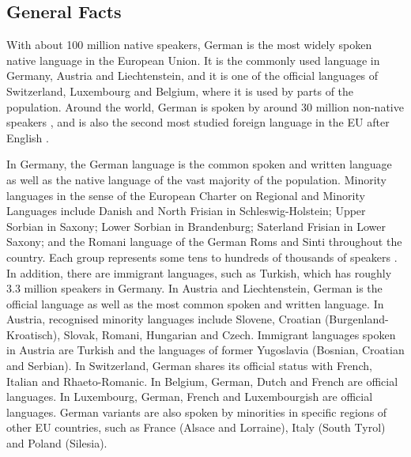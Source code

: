 \clearpage


\begin{multicols}{2}

\subsection{General Facts}

With about 100 million native speakers, German is the most widely spoken native language in the European Union. It is the commonly used language in Germany, Austria and Liechtenstein, and it is one of the official languages of Switzerland, Luxembourg and Belgium, where it is used by parts of the population. Around the world, German is spoken by around 30 million non-native speakers \cite{Eur1}, and is also the second most studied foreign language in the EU after English \cite{Goe1}. 

In Germany, the German language is the common spoken and written language as well as the native language of the vast majority of the population. Minority languages in the sense of the European Charter on Regional and Minority Languages include Danish and North Frisian in Schleswig-Holstein; Upper Sorbian in Saxony; Lower Sorbian in Brandenburg; Saterland Frisian in Lower Saxony; and the Romani language of the German Roms and Sinti throughout the country. Each group represents some tens to hundreds of thousands of speakers \cite{Efni1}. In addition, there are immigrant languages, such as Turkish, which has roughly 3.3 million speakers in Germany.
In Austria and Liechtenstein, German is the official language as well as the most common spoken and written language. In Austria, recognised minority languages include Slovene, Croatian (Burgenland-Kroatisch), Slovak, Romani, Hungarian and Czech. Immigrant languages spoken in Austria are Turkish and the languages of former Yugoslavia (Bosnian, Croatian and Serbian).
In Switzerland, German shares its official status with French, Italian and Rhaeto-Romanic. In Belgium, German, Dutch and French are official languages. In Luxembourg, German, French and Luxembourgish are official languages. German variants are also spoken by minorities in specific regions of other EU countries, such as France (Alsace and Lorraine), Italy (South Tyrol) and Poland (Silesia).


\end{multicols}
